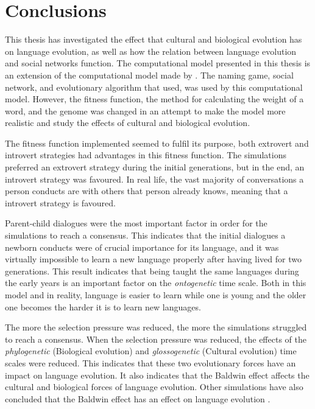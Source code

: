 \acresetall
\chapter{Conclusions}\label{ch:Chapter7}

This thesis has investigated the effect that cultural and biological evolution has on language evolution, as well as how the relation between language evolution and social networks function. The computational model presented in this thesis is an extension of the computational model made by \citet{lekvam2014co}. The naming game, social network, and evolutionary algorithm that \citeauthor{lekvam2014co} used, was used by this computational model. However, the fitness function, the method for calculating the weight of a word, and the genome was changed in an attempt to make the model more realistic and study the effects of cultural and biological evolution.
 
The fitness function implemented seemed to fulfil its purpose, both extrovert and introvert strategies had advantages in this fitness function. The simulations preferred an extrovert strategy during the initial generations, but in the end, an introvert strategy was favoured. In real life, the vast majority of conversations a person conducts are with others that person already knows, meaning that a introvert strategy is favoured.
 
Parent-child dialogues were the most important factor in order for the simulations to reach a consensus. This indicates that the initial dialogues a newborn conducts were of crucial importance for its language, and it was virtually impossible to learn a new language properly after having lived for two generations. This result indicates that being taught the same languages during the early years is an important factor on the \textit{ontogenetic} time scale. Both in this model and in reality, language is easier to learn while one is young and the older one becomes the harder it is to learn new languages.
 
The more the selection pressure was reduced, the more the simulations struggled to reach a consensus. When the selection pressure was reduced, the effects of the \textit{phylogenetic} (Biological evolution) and \textit{glossogenetic} (Cultural evolution) time scales were reduced. This indicates that these two evolutionary forces have an impact on language evolution. It also indicates that the Baldwin effect \citep{baldwin1896new} affects the cultural and biological forces of language evolution. Other simulations have also concluded that the Baldwin effect has an effect on language evolution \citep{lipowska2011naming, zollman2010plasticity, chater2010language}.

